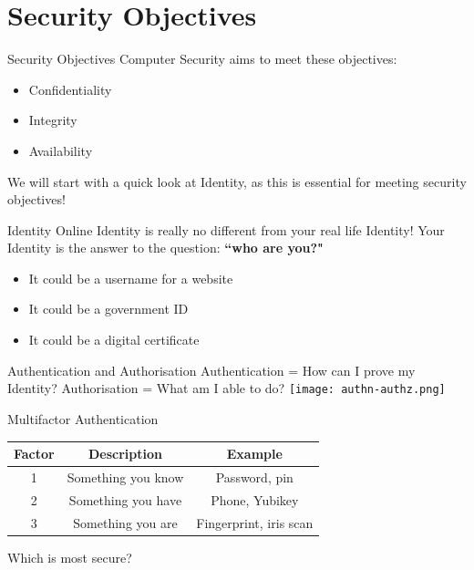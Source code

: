 \documentclass[aspectratio=169]{beamer}
\begin{document}
\section{Security Objectives}
\frame{\sectionpage}

\begin{frame}{Security Objectives}
Computer Security aims to meet these objectives: 
	\begin{itemize}
		\item Confidentiality
		\item Integrity
        \item Availability
	\end{itemize}
We will start with a quick look at Identity, as this is essential for meeting security objectives!
\end{frame}

\begin{frame}{Identity}
Online Identity is really no different from your real life Identity! 
Your Identity is the answer to the question: \textbf{``who are you?"}
\begin{itemize}
\item It could be a username for a website
\item It could be a government ID
\item It could be a digital certificate
\end{itemize}
\end{frame}

\begin{frame}{Authentication and Authorisation}
Authentication = How can I prove my Identity?
Authorisation = What am I able to do?
\texttt{[image: authn-authz.png]}
\end{frame}

\begin{frame}{Multifactor Authentication}
\begin{center}
\begin{tabular}{ |c|c|c| }
\hline
 \textbf{Factor} & \textbf{Description} & \textbf{Example}\\
\hline \hline
 1 & Something you know & Password, pin\\ \hline
 2 & Something you have & Phone, Yubikey \\  \hline
 3 & Something you are & Fingerprint, iris scan \\ \hline
\end{tabular}
\end{center}
Which is most secure?
\end{frame}
\end{document}
